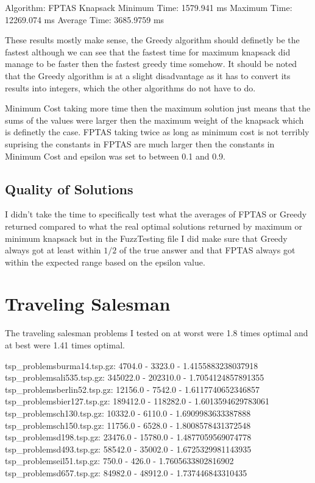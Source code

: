 \documentclass{article}
\begin{document}
Algorithm: FPTAS Knapsack \newline
  Minimum Time: 1579.941 ms \newline
  Maximum Time: 12269.074 ms \newline
  Average Time: 3685.9759 ms \newline

These results mostly make sense, the Greedy algorithm should definetly be the fastest although we can see that the fastest time for maximum knapsack did manage to be faster then the fastest greedy time somehow. It should be noted that the Greedy algorithm is at a slight disadvantage as it has to convert its results into integers, which the other algorithms do not have to do.

Minimum Cost taking more time then the maximum solution just means that the sums of the values were larger then the maximum weight of the knapsack which is definetly the case. FPTAS taking twice as long as minimum cost is not terribly suprising the constants in FPTAS are much larger then the constants in Minimum Cost and epsilon was set to between 0.1 and 0.9.

\subsection*{Quality of Solutions}
I didn't take the time to specifically test what the averages of FPTAS or Greedy returned compared to what the real optimal solutions returned by maximum or minimum knapsack but in the FuzzTesting file I did make sure that Greedy always got at least within $1/2$ of the true answer and that FPTAS always got within the expected range based on the epsilon value.

\section*{Traveling Salesman}
The traveling salesman problems I tested on at worst were 1.8 times optimal and at best were 1.41 times optimal. 


tsp\_problems\/burma14.tsp.gz: 4704.0 - 3323.0 - 1.4155883238037918\newline
tsp\_problems\/ali535.tsp.gz: 345022.0 - 202310.0 - 1.7054124857891355\newline
tsp\_problems\/berlin52.tsp.gz: 12156.0 - 7542.0 - 1.6117740652346857\newline
tsp\_problems\/bier127.tsp.gz: 189412.0 - 118282.0 - 1.6013594629783061\newline
tsp\_problems\/ch130.tsp.gz: 10332.0 - 6110.0 - 1.6909983633387888\newline
tsp\_problems\/ch150.tsp.gz: 11756.0 - 6528.0 - 1.8008578431372548\newline
tsp\_problems\/d198.tsp.gz: 23476.0 - 15780.0 - 1.4877059569074778\newline
tsp\_problems\/d493.tsp.gz: 58542.0 - 35002.0 - 1.6725329981143935\newline
tsp\_problems\/eil51.tsp.gz: 750.0 - 426.0 - 1.7605633802816902\newline
tsp\_problems\/d657.tsp.gz: 84982.0 - 48912.0 - 1.737446843310435\newline
\end{document}
